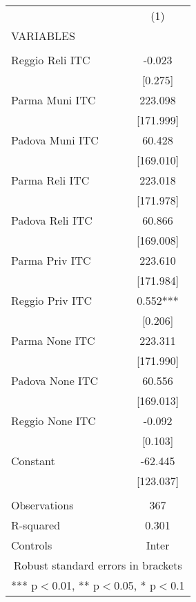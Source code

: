 \begin{tabular}{lc} \hline
 & (1) \\
VARIABLES &  \\ \hline
 &  \\
Reggio Reli ITC & -0.023 \\
 & [0.275] \\
Parma Muni ITC & 223.098 \\
 & [171.999] \\
Padova Muni ITC & 60.428 \\
 & [169.010] \\
Parma Reli ITC & 223.018 \\
 & [171.978] \\
Padova Reli ITC & 60.866 \\
 & [169.008] \\
Parma Priv ITC & 223.610 \\
 & [171.984] \\
Reggio Priv ITC & 0.552*** \\
 & [0.206] \\
Parma None ITC & 223.311 \\
 & [171.990] \\
Padova None ITC & 60.556 \\
 & [169.013] \\
Reggio None ITC & -0.092 \\
 & [0.103] \\
Constant & -62.445 \\
 & [123.037] \\
 &  \\
Observations & 367 \\
R-squared & 0.301 \\
 Controls & Inter \\ \hline
\multicolumn{2}{c}{ Robust standard errors in brackets} \\
\multicolumn{2}{c}{ *** p$<$0.01, ** p$<$0.05, * p$<$0.1} \\
\end{tabular}
